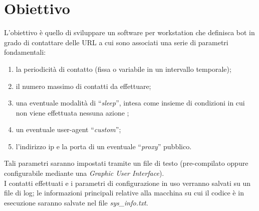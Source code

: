 \section{Obiettivo}
L'obiettivo \`e quello di sviluppare un software per workstation che definisca bot in grado di contattare delle URL a cui sono associati una serie di parametri fondamentali:
\begin{enumerate}
\item la periodicit\`{a} di contatto (fissa o variabile in un intervallo temporale);
\item il numero massimo di contatti da effettuare;
\item una eventuale modalit\`{a} di ``\textit{sleep}'', intesa come insieme di condizioni in cui non viene effettuata nessuna azione ;
\item un eventuale user-agent ``\textit{custom}'';
\item l'indirizzo ip e la porta di un eventuale ``\textit{proxy}'' pubblico.
\end{enumerate}
Tali parametri saranno impostati tramite un file di testo (pre-compilato oppure configurabile mediante una \textit{Graphic User Interface}).\\
I contatti effettuati e i parametri di configurazione in uso verranno salvati su un file di log;
le informazioni principali relative alla macchina su cui il codice \`{e} in esecuzione saranno salvate nel file \textit{sys\_info.txt}.

